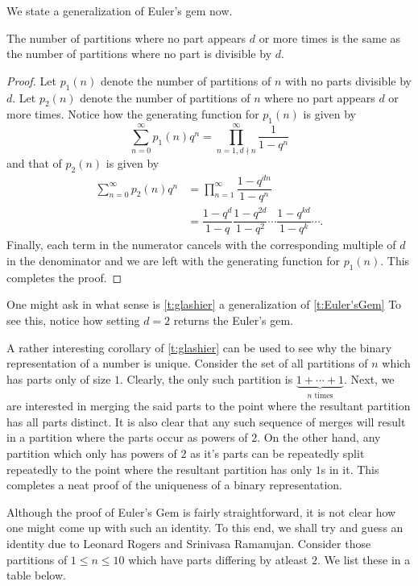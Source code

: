 We state a generalization of Euler's gem now. 
\begin{theorem}
The number of partitions where no part appears $d$ or more times is the same as the number of partitions where no part is divisible by $d$.
\label{t:glashier}
\end{theorem}
\begin{proof}
Let $p_1(n)$ denote the number of partitions of $n$ with no parts divisible by $d$. Let $p_2(n)$ denote the number of partitions of $n$ where no part appears $d$ or more times. Notice how the generating function for $p_1(n)$ is given by \[
\sum_{n=0}^{\infty}p_1(n)q^n = \prod_{n=1, d\nmid n}^{\infty}\dfrac{1}{1-q^n}
\]
and that of $p_2(n)$ is given by 
\begin{align*}
\sum_{n=0}^{\infty}p_2(n)q^n &= \prod_{n=1}^{\infty}\dfrac{1-q^{dn}}{1-q^n} \\
&= \dfrac{1-q^d}{1-q}\dfrac{1-q^{2d}}{1-q^2}\cdots\dfrac{1-q^{kd}}{1-q^k}\cdots.
\end{align*}
Finally, each term in the numerator cancels with the corresponding multiple of $d$ in the denominator and we are left with the generating function for $p_1(n)$. This completes the proof.
\end{proof}
\begin{remark}
One might ask in what sense is \cref{t:glashier} a generalization of \cref{t:Euler'sGem} To see this, notice how setting $d=2$ returns the Euler's gem.  
\end{remark}
A rather interesting corollary of \cref{t:glashier} can be used to see why the binary representation of a number is unique. Consider the set of all partitions of $n$ which has parts only of size $1$. Clearly, the only such partition is $\underbrace{1+\cdots+1}_{n\text{ times}}$. Next, we are interested in merging the said parts to the point where the resultant partition has all parts distinct. It is also clear that any such sequence of merges will result in a partition where the parts occur as powers of $2$. On the other hand, any partition which only has powers of $2$ as it's parts can be repeatedly split repeatedly to the point where the resultant partition has only $1$s in it. This completes a neat proof of the uniqueness of a binary representation. 
\par
Although the proof of Euler's Gem is fairly straightforward, it is not clear how one might come up with such an identity. To this end, we shall try and guess an identity due to Leonard Rogers and Srinivasa Ramanujan. Consider those partitions of $1\leq n\leq 10$ which have parts differing by atleast $2$. We list these in a table below.
